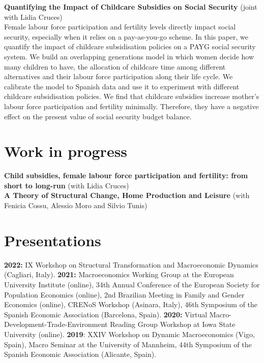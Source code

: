 \documentclass[margin]{res} %
\begin{document}
\begin{resume}
{\bf Quantifying the Impact of Childcare Subsidies on Social Security} (joint with Lidia Cruces) \\
Female labour force participation and fertility levels directly impact social security, especially when it relies on a pay-as-you-go scheme. In this paper, we quantify the impact of childcare subsidisation policies on a PAYG social security system. We build an overlapping generations model in which women decide how many children to have, the allocation of childcare time among different alternatives and their labour force participation along their life cycle. We calibrate the model to Spanish data and use it to experiment with different childcare subsidisation policies. We find that childcare subsidies increase mother's labour force participation and fertility minimally. Therefore, they have a negative effect on the present value of social security budget balance. 

\section{Work in progress}

{\bf Child subsidies, female labour force participation
and fertility: from short to long-run} (with Lidia Cruces)
\\
{\bf A Theory of Structural Change, Home Production and Leisure} (with Fenicia Cossu, Alessio Moro and Silvio Tunis)

\section{Presentations}

{\bf 2022:} IX Workshop on Structural Transformation and Macroeconomic Dynamics (Cagliari, Italy). {\bf 2021:} Macroeconomics Working Group at the European University Institute (online), 34th Annual Conference of the European Society for Population Economics (online), 2nd Brazilian Meeting in Family and Gender Economics (online), CRENoS Workshop (Asinara, Italy), 46th Symposium of the Spanish Economic Association (Barcelona, Spain). {\bf 2020:} Virtual Macro-Development-Trade-Environment Reading Group Workshop at Iowa State University (online). {\bf 2019}: XXIV Workshop on Dynamic Macroeconomics (Vigo, Spain), Macro Seminar at the University of Mannheim, 44th Symposium of the Spanish Economic Association (Alicante, Spain).



\end{resume}
\end{document}
